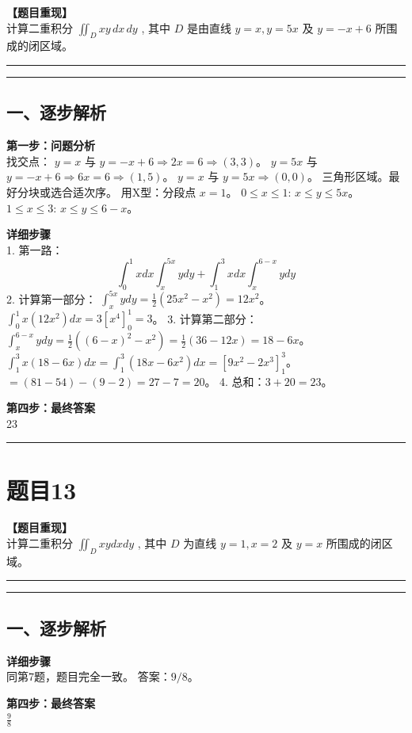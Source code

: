 \documentclass[12pt, a4paper]{ctexart}
\newcommand{\TopSeparator}{
    \par\noindent\rule{\textwidth}{1.5pt}\vspace{0.5em} %
}
\newcommand{\AnalysisSeparator}{
    \par\noindent\rule{\textwidth}{0.5pt}\vspace{0.2em}\hrule\vspace{0.5em} %
}
\newenvironment{RedAnalysis}{
    \par
    \color{red} %
}{
    \par
    \color{black} %
}
\begin{document}
\textbf{【题目重现】} \\
计算二重积分 $ \iint_{D} xy \, dx \, dy $ , 其中 $D$ 是由直线 $ y = x, y = 5x $ 及 $ y = -x + 6 $ 所围成的闭区域。

\AnalysisSeparator

\begin{RedAnalysis}

\subsection*{一、逐步解析}

\textbf{第一步：问题分析} \\
找交点：
$y=x$ 与 $y=-x+6 \Rightarrow 2x=6 \Rightarrow (3,3)$。
$y=5x$ 与 $y=-x+6 \Rightarrow 6x=6 \Rightarrow (1,5)$。
$y=x$ 与 $y=5x \Rightarrow (0,0)$。
三角形区域。最好分块或选合适次序。
用X型：分段点 $x=1$。
$0 \le x \le 1$: $x \le y \le 5x$。
$1 \le x \le 3$: $x \le y \le 6-x$。

\textbf{详细步骤} \\
1. 第一路：
   \[ \int_0^1 x dx \int_x^{5x} y dy + \int_1^3 x dx \int_x^{6-x} y dy \]
2. 计算第一部分：
   $\int_x^{5x} y dy = \frac{1}{2}(25x^2 - x^2) = 12x^2$。
   $\int_0^1 x(12x^2) dx = 3[x^4]_0^1 = 3$。
3. 计算第二部分：
   $\int_x^{6-x} y dy = \frac{1}{2}((6-x)^2 - x^2) = \frac{1}{2}(36 - 12x) = 18 - 6x$。
   $\int_1^3 x(18 - 6x) dx = \int_1^3 (18x - 6x^2) dx = [9x^2 - 2x^3]_1^3$。
   $= (81 - 54) - (9 - 2) = 27 - 7 = 20$。
4. 总和：$3 + 20 = 23$。

\textbf{第四步：最终答案} \\
23

\end{RedAnalysis}

\vspace{2em}

\TopSeparator
\section*{题目13}

\textbf{【题目重现】} \\
计算二重积分 $ \iint_{D} xydxdy $ , 其中 $D$ 为直线 $ y = 1, x = 2 $ 及 $ y = x $ 所围成的闭区域。

\AnalysisSeparator

\begin{RedAnalysis}

\subsection*{一、逐步解析}

\textbf{详细步骤} \\
同第7题，题目完全一致。
答案：$9/8$。

\textbf{第四步：最终答案} \\
$ \frac{9}{8} $

\end{RedAnalysis}
\end{document}
